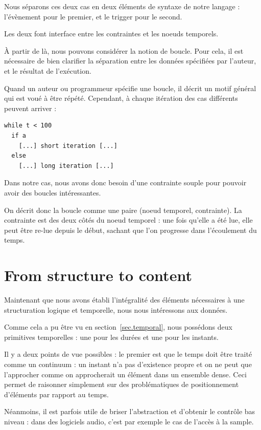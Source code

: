 \documentclass{sigchi}
\begin{document}
Nous séparons ces deux cas en deux éléments de syntaxe de notre langage : l'évènement pour le premier, et le trigger pour le second.

Les deux font interface entre les contraintes et les noeuds temporels.

À partir de là, nous pouvons considérer la notion de boucle. Pour cela, il est nécessaire de bien clarifier la séparation entre les données spécifiées par l'auteur, et le résultat de l'exécution.

Quand un auteur ou programmeur spécifie une boucle, il décrit un motif général qui est voué à être répété. Cependant, à chaque itération des cas différents peuvent arriver : 

\begin{lstlisting}
while t < 100
  if a
    [...] short iteration [...]
  else
    [...] long iteration [...]           
\end{lstlisting}

Dans notre cas, nous avons donc besoin d'une contrainte souple pour pouvoir avoir des boucles intéressantes. 

On décrit donc la boucle comme une paire (noeud temporel, contrainte). La contrainte est des deux côtés du noeud temporel : une fois qu'elle a été lue, elle peut être re-lue depuis le début, sachant que l'on progresse dans l'écoulement du temps.


\section{From structure to content}
Maintenant que nous avons établi l'intégralité des éléments nécessaires à une structuration logique et temporelle, nous nous intéressons aux données.

Comme cela a pu être vu en section~\ref{sec.temporal}, nous possédons deux primitives temporelles : une pour les durées et une pour les instants.

Il y a deux points de vue possibles : le premier est que le temps doit être traité comme un continuum : un instant n'a pas d'existence propre et on ne peut que l'approcher comme on approcherait un élément dans un ensemble dense. Ceci permet de raisonner simplement sur des problématiques de positionnement d'éléments par rapport au temps.

Néanmoins, il est parfois utile de briser l'abstraction et d'obtenir le contrôle bas niveau : dans des logiciels audio, c'est par exemple le cas de l'accès à la sample.
\end{document}
